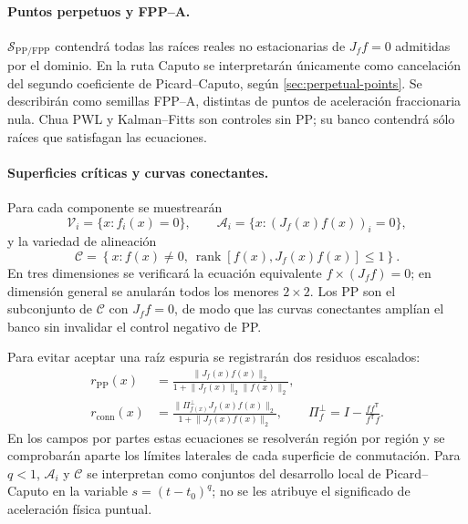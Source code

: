 \paragraph{Puntos perpetuos y FPP--A.}
\(\mathcal S_{\mathrm{PP/FPP}}\) contendrá todas las raíces reales no
estacionarias de \(J_f f=0\) admitidas por el dominio. En la ruta Caputo se
interpretarán únicamente como cancelación del segundo coeficiente de
Picard--Caputo, según \cref{sec:perpetual-points}. Se describirán como semillas
FPP--A, distintas de puntos de aceleración fraccionaria nula. Chua PWL y
Kalman--Fitts son controles sin PP; su banco contendrá sólo raíces que satisfagan
las ecuaciones.

\paragraph{Superficies críticas y curvas conectantes.}
Para cada componente se muestrearán
\begin{equation}
 \mathcal V_i=\{x:f_i(x)=0\},
 \qquad
 \mathcal A_i=\{x:(J_f(x)f(x))_i=0\},
 \label{camp:eq-critical-surfaces}
\end{equation}
y la variedad de alineación
\begin{equation}
 \mathcal C=
 \left\{x:f(x)\neq0,\
 \operatorname{rank}[f(x),J_f(x)f(x)]\leq1\right\}.
 \label{camp:eq-connecting-set}
\end{equation}
En tres dimensiones se verificará la ecuación equivalente
\(f\times(J_f f)=0\); en dimensión general se anularán todos los menores
\(2\times2\). Los PP son el subconjunto de \(\mathcal C\) con \(J_f f=0\), de
modo que las curvas conectantes amplían el banco sin invalidar el control
negativo de PP.

Para evitar aceptar una raíz espuria se registrarán dos residuos escalados:
\begin{align}
 r_{\mathrm{PP}}(x)
 &=\frac{\lVert J_f(x)f(x)\rVert_2}
        {1+\lVert J_f(x)\rVert_2\lVert f(x)\rVert_2},
 \label{camp:eq-pp-residual}\\
 r_{\mathrm{conn}}(x)
 &=\frac{\lVert \Pi_{f(x)}^{\perp}J_f(x)f(x)\rVert_2}
        {1+\lVert J_f(x)f(x)\rVert_2},
 \qquad
 \Pi_f^{\perp}=I-\frac{ff^{\mathsf T}}{f^{\mathsf T}f}.
 \label{camp:eq-connecting-residual}
\end{align}
En los campos por partes estas ecuaciones se resolverán región por región y se
comprobarán aparte los límites laterales de cada superficie de conmutación.
Para \(q<1\), \(\mathcal A_i\) y \(\mathcal C\) se interpretan como conjuntos
del desarrollo local de Picard--Caputo en la variable \(s=(t-t_0)^q\); no se
les atribuye el significado de aceleración física puntual.

